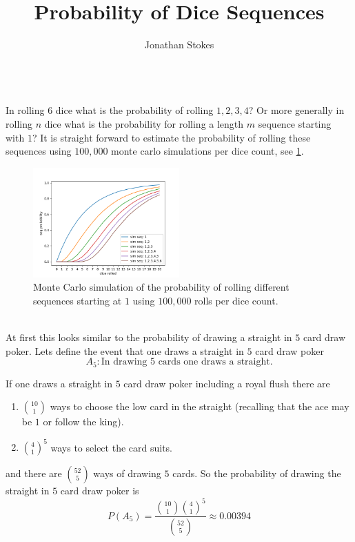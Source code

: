 \documentclass[12pt,a4paper]{article}
\title{Probability of Dice Sequences}
\author{Jonathan Stokes}
\begin{document}
\maketitle

\hrulefill\\

In rolling $6$ dice what is the probability of rolling $1,2,3,4$? Or more generally in rolling $n$ dice what is the probability for rolling a length $m$ sequence starting with $1$?
It is straight forward to estimate the probability of rolling these sequences using $100,000$ monte carlo simulations per dice count, see \cref{fig:monte_carlo_sim}.\\

\begin{figure}[H]
    \centering
    \includegraphics[width=0.5\textwidth]{figs/monte_carlo_seq_prob.png}
    \caption{Monte Carlo simulation of the probability of rolling different sequences starting at $1$ using $100,000$ rolls per dice count.}
    \label{fig:monte_carlo_sim}
\end{figure}

\hrulefill\\

At first this looks similar to the probability of drawing a straight in $5$ card draw poker. Lets define the event that one draws a straight in $5$ card draw poker
\begin{equation*}
A_5: \text{In drawing $5$ cards one draws a straight.}
\end{equation*}

If one draws a straight in $5$ card draw poker including a royal flush there are 

\begin{enumerate}
\item $\binom{10}{1}$ ways to choose the low card in the straight (recalling that the ace may be $1$ or follow the king). 
\item $\binom{4}{1}^5$ ways to select the card suits.
\end{enumerate}
and there are $\binom{52}{5}$ ways of drawing $5$ cards. So the probability of drawing the straight in $5$ card draw poker is
\begin{equation}
P(A_5) = \frac{\binom{10}{1}\binom{4}{1}^5}{\binom{52}{5}} \approx 0.00394
\end{equation}
\end{document}
